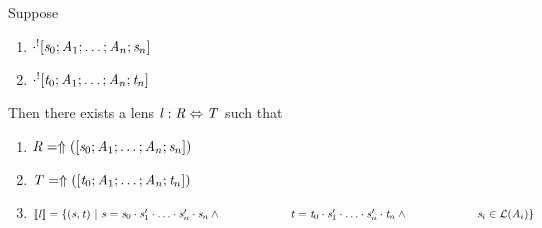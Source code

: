 \documentclass[numbers,10pt,preprint\ifanon ,nocopyrightspace\fi]{sigplanconf}
\begin{document}
\begin{lemma}
  \label{lem:boilerplate-alterations}
  Suppose
  \begin{enumerate}
  \item $\cdot^![\mathit{s}_0;\mathit{A}_1;\ldots;\mathit{A}_n;\mathit{s}_n]$
  \item $\cdot^![\mathit{t}_0;\mathit{A}_1;\ldots;\mathit{A}_n;\mathit{t}_n]$
  \end{enumerate}
  Then there exists a lens
  $\mathit{l} : \mathit{R} \Leftrightarrow \mathit{T}$ such that
  \begin{enumerate}
  \item $\mathit{R} = \Uparrow([\mathit{s}_0;\mathit{A}_1;\ldots;\mathit{A}_n;\mathit{s}_n])$
  \item $\mathit{T} = \Uparrow([\mathit{t}_0;\mathit{A}_1;\ldots;\mathit{A}_n;\mathit{t}_n])$
  \item $[ \! [\mathit{l}] \! ]=\{(\mathit{s},\mathit{t})~|~
      \mathit{s}=\mathit{s}_0\cdot\mathit{s}_1'\cdot\ldots\cdot\mathit{s}_n'\cdot\mathit{s}_n
      \wedge\\
      \hspace*{6.1em}\mathit{t}=\mathit{t}_0\cdot\mathit{s}_1'\cdot\ldots\cdot\mathit{s}_n'\cdot\mathit{t}_n
      \wedge\\
      \hspace*{6.1em}\mathit{s}_i\in\mathcal{L}(\mathit{A}_i)\}$
  \end{enumerate}
\end{lemma}
\end{document}
